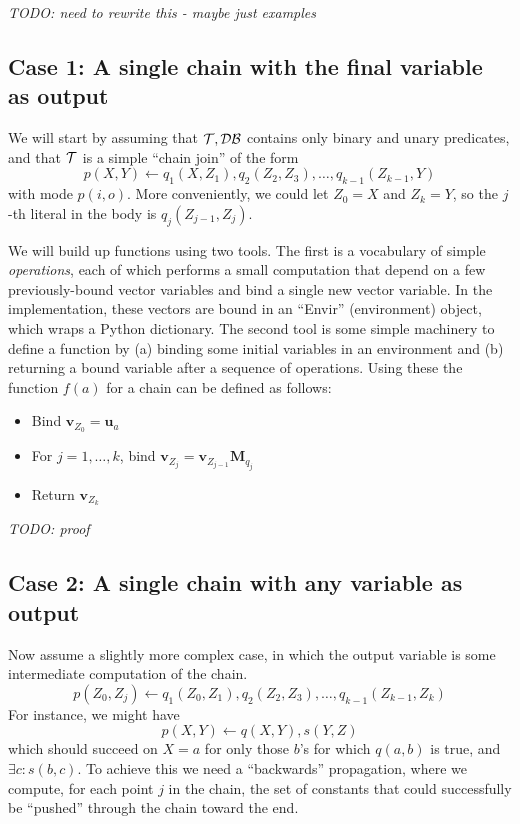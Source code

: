 \documentclass[12pt]{article}
\newcommand{\yy}[1]{\textit{TODO: {#1}}}
\newcommand{\trm}[1]{\textit{#1}}
\newcommand{\vek}[1]{\textbf{#1}}
\newcommand{\M}{\textbf{M}}
\begin{document}
\yy{need to rewrite this - maybe just examples}

\subsection{Case 1: A single chain with the final variable as output}

We will start by assuming that ${\cal T,DB}$ contains only binary and
unary predicates, and that ${\cal T}$ is a simple ``chain join'' of
the form
\[ p(X,Y) \leftarrow q_1(X,Z_1),q_2(Z_2,Z_3),\ldots,q_{k-1}(Z_{k-1},Y)
\]
with mode $p(i,o)$.  More conveniently, we could let $Z_0=X$ and
$Z_k=Y$, so the $j$-th literal in the body is $q_j(Z_{j-1},Z_j)$.

We will build up functions using two tools.  The first is a vocabulary
of simple \trm{operations}, each of which performs a small computation
that depend on a few previously-bound vector variables and bind a
single new vector variable. In the implementation, these vectors are
bound in an ``Envir'' (environment) object, which wraps a Python
dictionary.  The second tool is some simple machinery to define a
function by (a) binding some initial variables in an environment and
(b) returning a bound variable after a sequence of operations.  Using
these the function $f(a)$ for a chain can be defined as follows:

\begin{itemize}
\item Bind $\vek{v}_{Z_0} = \vek{u}_a$
\item For $j=1,\ldots,k$, bind $\vek{v}_{Z_j} = \vek{v}_{Z_{j-1}} \M_{q_j}$
\item Return $\vek{v}_{Z_{k}}$
\end{itemize}

\yy{proof}

\subsection{Case 2: A single chain with any variable as output}

Now assume a slightly more complex case, in which the output variable
is some intermediate computation of the chain.
\[ p(Z_0,Z_j) \leftarrow q_1(Z_0,Z_1),q_2(Z_2,Z_3),\ldots,q_{k-1}(Z_{k-1},Z_k)
\]
For instance, we might have
\[ p(X,Y) \leftarrow q(X,Y),s(Y,Z)
\]
which should succeed on $X=a$ for only those $b$'s for which $q(a,b)$
is true, and $\exists c: s(b,c)$.  To achieve this we need a
``backwards'' propagation, where we compute, for each point $j$ in the
chain, the set of constants that could successfully be ``pushed''
through the chain toward the end.  
\end{document}
